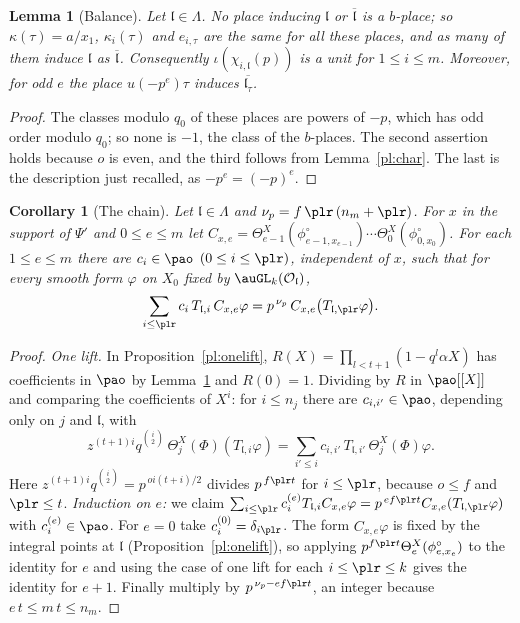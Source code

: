 \documentclass[10pt]{amsart}
\newtheorem{lemma}[theorem]{Lemma}
\newtheorem{corollary}[theorem]{Corollary}
\theoremstyle{definition}
\theoremstyle{remark}
\providecommand{\auO}{\mathcal O}
\providecommand{\aubar}[1]{\overline{#1}}
\begin{document}
\begin{lemma}[Balance]\label{pl:balance}
Let $\mathfrak l\in\Lambda$. No place inducing $\mathfrak l$ or $\aubar{\mathfrak l}$ is a
$b$-place; so $\kappa(\tau)=a/x_1$, $\kappa_i(\tau)$ and $e_{i,\tau}$ are the same for all these
places, and as many of them induce $\mathfrak l$ as $\aubar{\mathfrak l}$. Consequently
$\iota(\chi_{i,\mathfrak l}(p))$ is a unit for $1\le i\le m$. Moreover, for odd $e$ the place
$u(-p^e)\tau$ induces $\aubar{\mathfrak l_\tau}$.
\end{lemma}
\begin{proof}
The classes modulo $q_0$ of these places are powers of $-p$, which has odd order modulo $q_0$; so
none is $-1$, the class of the $b$-places. The second assertion holds because $o$ is even, and the
third follows from Lemma~\ref{pl:char}. The last is the description just recalled, as $-p^e=
(-p)^e$.
\end{proof}

\begin{corollary}[The chain]\label{pl:chainT}
Let $\mathfrak l\in\Lambda$ and $\nu_p=f\,\plr\,(n_m+\plr)$. For $x$ in the support of $\Psi'$ and
$0\le e\le m$ let $C_{x,e}=\Theta^X_{e-1}(\phi^\circ_{e-1,x_{e-1}})\cdots\Theta^X_0(\phi^\circ_{0,
x_0})$. For each $1\le e\le m$ there are $c_i\in\pao$ $(0\le i\le\plr)$, independent of $x$, such
that for every smooth form $\varphi$ on $X_0$ fixed by $\auGL_k(\auO_{\mathfrak l})$,
\[
\sum_{i\le\plr}c_i\,T_{\mathfrak l,i}\,C_{x,e}\varphi=p^{\,\nu_p}\,C_{x,e}\bigl(T_{\mathfrak l,
\plr}\varphi\bigr).
\]
\end{corollary}
\begin{proof}
\emph{One lift.} In Proposition~\ref{pl:onelift}, $R(X)=\prod_{l<t+1}(1-q^l\alpha X)$ has
coefficients in $\pao$ by Lemma~\ref{pl:balance} and $R(0)=1$. Dividing by $R$ in $\pao[[X]]$ and
comparing the coefficients of $X^i$: for $i\le n_j$ there are $c_{i,i'}\in\pao$, depending only on
$j$ and $\mathfrak l$, with
\[
z^{(t+1)i}q^{\binom i2}\,\Theta^X_j(\Phi)(T_{\mathfrak l,i}\varphi)=\sum_{i'\le i}c_{i,i'}\,
T_{\mathfrak l,i'}\,\Theta^X_j(\Phi)\varphi .
\]
Here $z^{(t+1)i}q^{\binom i2}=p^{\,oi(t+i)/2}$ divides $p^{\,f\plr t}$ for $i\le\plr$, because
$o\le f$ and $\plr\le t$. \emph{Induction on $e$:} we claim $\sum_{i\le\plr}c^{(e)}_iT_{\mathfrak
l,i}C_{x,e}\varphi=p^{\,ef\plr t}C_{x,e}(T_{\mathfrak l,\plr}\varphi)$ with $c_i^{(e)}\in\pao$.
For $e=0$ take $c^{(0)}_i=\delta_{i\plr}$. The form $C_{x,e}\varphi$ is fixed by the integral
points at $\mathfrak l$ (Proposition~\ref{pl:onelift}), so applying $p^{f\plr t}\Theta^X_e
(\phi^\circ_{e,x_e})$ to the identity for $e$ and using the case of one lift for each $i\le\plr\le
k$ gives the identity for $e+1$. Finally multiply by $p^{\,\nu_p-ef\plr t}$, an integer because
$e\,t\le m\,t\le n_m$.
\end{proof}
\end{document}
